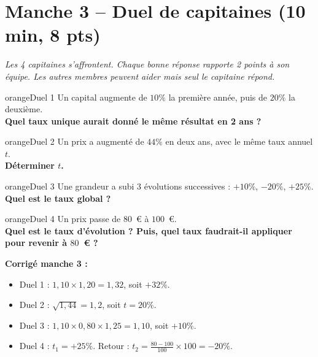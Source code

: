 \documentclass[12pt,a4paper]{article}
\begin{document}
\newpage

\section*{Manche 3 -- Duel de capitaines (10 min, 8 pts)}

\textit{Les 4 capitaines s’affrontent. Chaque bonne réponse rapporte 2 points à son équipe. Les autres membres peuvent aider mais seul le capitaine répond.}

\vspace{0.3cm}

\begin{carte}{orange}{Duel 1}
Un capital augmente de \(10\%\) la première année, puis de \(20\%\) la deuxième.\\[0.2cm]
\textbf{Quel taux unique aurait donné le même résultat en 2 ans ?}
\end{carte}

\begin{carte}{orange}{Duel 2}
Un prix a augmenté de \(44\%\) en deux ans, avec le même taux annuel \(t\).\\[0.2cm]
\textbf{Déterminer \(t\).}
\end{carte}

\begin{carte}{orange}{Duel 3}
Une grandeur a subi 3 évolutions successives : \(+10\%\), \(-20\%\), \(+25\%\).\\[0.2cm]
\textbf{Quel est le taux global ?}
\end{carte}

\begin{carte}{orange}{Duel 4}
Un prix passe de \(80\)~\euro{} à \(100\)~\euro{}.\\[0.2cm]
\textbf{Quel est le taux d’évolution ? Puis, quel taux faudrait-il appliquer pour revenir à \(80\)~\euro{} ?}
\end{carte}

\vspace{0.3cm}
\textbf{Corrigé manche 3 :}
\begin{itemize}
    \item Duel 1 : \(1{,}10 \times 1{,}20 = 1{,}32\), soit \(+32\%\).
    \item Duel 2 : \(\sqrt{1{,}44} = 1{,}2\), soit \(t = 20\%\).
    \item Duel 3 : \(1{,}10 \times 0{,}80 \times 1{,}25 = 1{,}10\), soit \(+10\%\).
    \item Duel 4 : \(t_1 = +25\%\). Retour : \(t_2 = \frac{80-100}{100} \times 100 = -20\%\).
\end{itemize}
\end{document}
